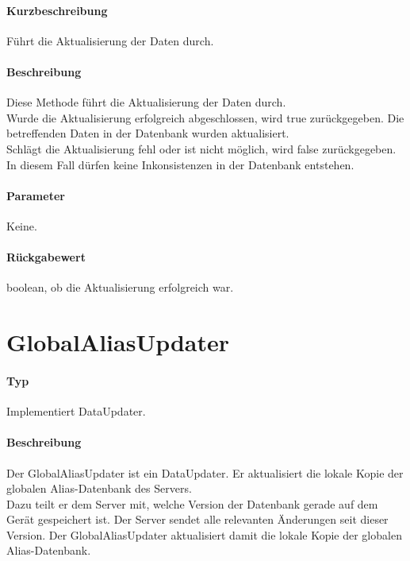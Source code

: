 \paragraph*{Kurzbeschreibung}
Führt die Aktualisierung der Daten durch.
\paragraph*{Beschreibung}
Diese Methode führt die Aktualisierung der Daten durch.\\
Wurde die Aktualisierung erfolgreich abgeschlossen, wird true zurückgegeben. 
Die betreffenden Daten in der Datenbank wurden aktualisiert.\\
Schlägt die Aktualisierung fehl oder ist nicht möglich, wird false zurückgegeben.
In diesem Fall dürfen keine Inkonsistenzen in der Datenbank entstehen.
\paragraph*{Parameter}
Keine.
\paragraph*{Rückgabewert}
boolean, ob die Aktualisierung erfolgreich war.

\section{GlobalAliasUpdater}
\paragraph*{Typ}
Implementiert DataUpdater.
\paragraph*{Beschreibung}
Der GlobalAliasUpdater ist ein DataUpdater. Er aktualisiert die lokale Kopie der globalen
Alias-Datenbank des Servers. \\
Dazu teilt er dem Server mit, welche Version der Datenbank gerade auf dem Gerät 
gespeichert ist. Der Server sendet alle relevanten Änderungen seit dieser Version. 
Der GlobalAliasUpdater aktualisiert damit die lokale Kopie der globalen Alias-Datenbank.